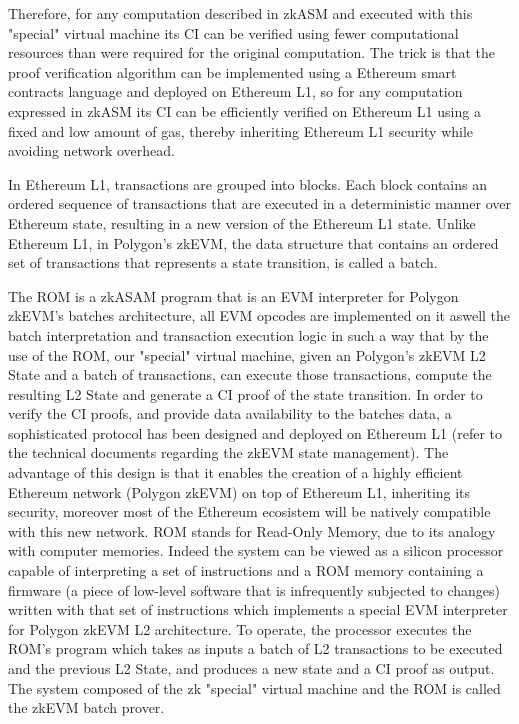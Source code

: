 Therefore, for any computation described in zkASM and executed with this "special" virtual machine its CI can be verified using fewer computational resources than were required for the original computation. The trick is that the proof verification algorithm can be implemented using a Ethereum smart contracts language and deployed on Ethereum L1, so for any computation expressed in zkASM its CI can be efficiently verified on Ethereum L1 using a fixed and low amount of gas, thereby inheriting Ethereum L1 security while avoiding network overhead. 

In Ethereum L1, transactions are grouped into blocks. Each block contains an ordered sequence of transactions that are executed in a deterministic manner over Ethereum state, resulting in a new version of the Ethereum L1 state. Unlike Ethereum L1, in Polygon's zkEVM, the data structure that contains an ordered set of transactions that represents a state transition, is called a batch.

The ROM is a zkASAM program that is an EVM interpreter for Polygon zkEVM's batches architecture, all EVM opcodes are implemented on it aswell the batch interpretation and transaction execution logic in such a way that by the use of the ROM, our "special" virtual machine, given an Polygon's zkEVM L2 State and a batch of transactions, can execute those transactions, compute the resulting L2 State and generate a CI proof of the state transition. In order to verify the CI proofs, and provide data availability to the batches data, a sophisticated protocol has been designed and deployed on Ethereum L1 (refer to the technical documents regarding the zkEVM state management). The advantage of this design is that it enables the creation of a highly efficient Ethereum network (Polygon zkEVM) on top of Ethereum L1, inheriting its security, moreover most of the Ethereum ecosistem will be natively compatible with this new network. ROM stands for Read-Only Memory, due to its analogy with computer memories. Indeed the system can be viewed as a silicon processor capable of interpreting a set of instructions and a ROM memory containing a firmware (a piece of low-level software that is infrequently subjected to changes) written with that set of instructions which implements a special EVM interpreter for Polygon zkEVM L2 architecture. To operate, the processor executes the ROM's program which takes as inputs a batch of L2 transactions to be executed and the previous L2 State, and produces a new state and a CI proof as output. The system composed of the zk "special" virtual machine and the ROM is called the zkEVM batch prover.

